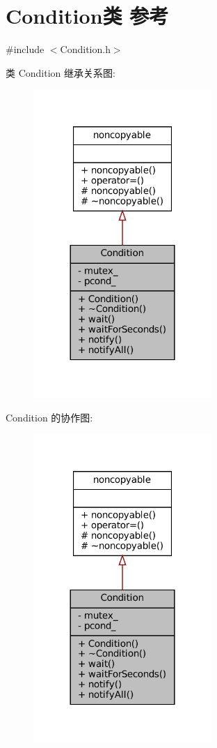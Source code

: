 \hypertarget{classmuduo_1_1Condition}{}\section{Condition类 参考}
\label{classmuduo_1_1Condition}


{\ttfamily \#include $<$Condition.\+h$>$}



类 Condition 继承关系图\+:
\nopagebreak
\begin{figure}[H]
\begin{center}
\leavevmode
\includegraphics[width=192pt]{classmuduo_1_1Condition__inherit__graph}
\end{center}
\end{figure}


Condition 的协作图\+:
\nopagebreak
\begin{figure}[H]
\begin{center}
\leavevmode
\includegraphics[width=192pt]{classmuduo_1_1Condition__coll__graph}
\end{center}
\end{figure}
